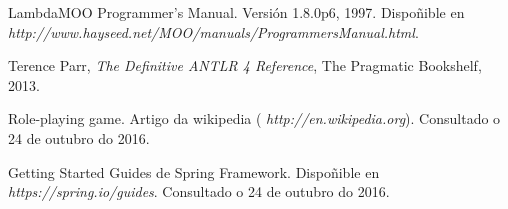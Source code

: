 

\begin{thebibliography}{99}

 LambdaMOO Programmer's Manual. Versión 1.8.0p6, 1997.
Dispoñible en {\it http://www.hayseed.net/MOO/manuals/ProgrammersManual.html}.

 Terence Parr, {\it The Definitive ANTLR 4 Reference}, The
Pragmatic Bookshelf, 2013.


 Role-playing game. Artigo da wikipedia ({\it
http://en.wikipedia.org}). Consultado o 24 de outubro do 2016.

 Getting Started Guides de Spring Framework. Dispoñible en {\it
https://spring.io/guides}. Consultado o 24 de outubro do 2016.

\end{thebibliography}